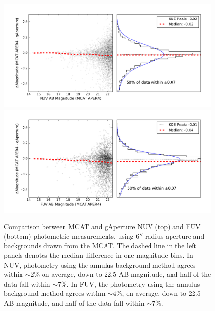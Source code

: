 \documentclass[preprint]{aastex}
\begin{document}
\begin{figure}[t!]
\includegraphics[scale=0.6]{Fig05a.pdf}\\
\includegraphics[scale=0.6]{Fig05b.pdf}
\caption{Comparison between MCAT and gAperture NUV (top) and FUV (bottom) photometric measurements, using $6''$ radius aperture and backgrounds drawn from the MCAT. The dashed line in the left panels denotes the median difference in one magnitude bins. In NUV, photometry using the annulus background method agrees within $\sim 2$\% on average, down to 22.5 AB magnitude, and half of the data fall within $\sim 7$\%. In FUV, the photometry using the annulus background method agrees within $\sim 4$\%, on average, down to 22.5 AB magnitude, and half of the data fall within $\sim 7$\%.
\label{mcatrelphot}}
\end{figure}
\clearpage
\end{document}
